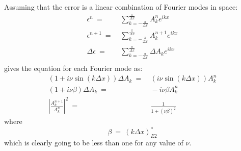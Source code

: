 \documentclass[conf]{new-aiaa}
\begin{document}
{{\begin{equation}
\end{equation}
Assuming that the error is a linear combination of Fourier modes in space: 
\begin{equation}
	\begin{split}
		\label{eq:Error_Fourier}
  			\epsilon^n~=&~\sum_{k=-\frac{\pi}{\Delta{x}}}^{\frac{\pi}{\Delta{x}}}{A_k^n e^{ikx}} \\
  			\epsilon^{n+1}~=&~\sum_{k=-\frac{\pi}{\Delta{x}}}^{\frac{\pi}{\Delta{x}}}{A_k^{n+1} e^{ikx}} \\
  			\Delta{\epsilon}~=&~\sum_{k=-\frac{\pi}{\Delta{x}}}^{\frac{\pi}{\Delta{x}}}{\Delta{A_k} e^{ikx}} \\
	\end{split}
\end{equation}
gives the equation for each Fourier mode as:
\begin{equation}
	\begin{split}
		\label{eq:Fourier_Mode}
  			\left(1+i\nu\sin(k\Delta{x})\right)\Delta{A_k}~=&~\left(i\nu\sin(k\Delta{x})\right)A_k^n \\
  			(1+i\nu\beta)\Delta{A_k}~=&~-i\nu\beta{A_k^n} \\
  			\left|\frac{A_k^{n+1}}{A_k^{n}} \right|^2~=&~\frac{1}{1+\left(\nu\beta\right)^2}
	\end{split}
\end{equation}
where
\begin{equation*}
	\beta~=~\left(k\Delta{x}\right)^*_{E2}
\end{equation*}
which is clearly going to be less than one for any value of $\nu$. 
}

}
\end{document}
